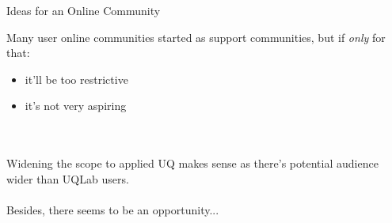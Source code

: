 \documentclass[]{rsuqbeamernew}
\begin{document}
\begin{frame}[t]{Ideas for an Online Community}

Many user online communities started as support communities, but if \emph{only} for that:
\begin{itemize}
  \item it'll be too restrictive %
  \item it's not very aspiring
\end{itemize}
\\~\\
Widening the scope to applied UQ makes sense as there's potential audience wider than UQLab users.
\\~\\
Besides, there seems to be an opportunity...
\\~\\
\end{frame}
\end{document}
